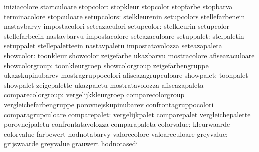                                   iniziacolore                     startculoare
                      stopcolor:  stopkleur                        stopcolor
                                  stopfarbe                        stopbarva
                                  terminacolore                    stopculoare
                    setupcolors:  stelkleurenin                    setupcolors
                                  stellefarbenein                  nastavbarvy
                                  impostacolori                    seteazaculori
                     setupcolor:  stelkleurin                      setupcolor
                                  stellefarbeein                   nastavbarvu
                                  impostacolore                    seteazaculoare
                     setuppalet:  stelpaletin                      setuppalet
                                  stellepaletteein                 nastavpaletu
                                  impostatavolozza                 seteazapaleta
                      showcolor:  toonkleur                        showcolor
                                  zeigefarbe                       ukazbarvu
                                  mostracolore                     afiseazaculoare
                 showcolorgroup:  toonkleurgroep                   showcolorgroup
                                  zeigefarbengruppe                ukazskupinubarev
                                  mostragruppocolori               afiseazagrupculoare
                      showpalet:  toonpalet                        showpalet
                                  zeigepalette                     ukazpaletu
                                  mostratavolozza                  afiseazapaleta
              comparecolorgroup:  vergelijkkleurgroep              comparecolorgroup
                                  vergleichefarbengruppe           porovnejskupinubarev
                                  confrontagruppocolori            comparagrupculoare
                   comparepalet:  vergelijkpalet                   comparepalet
                                  vergleichepalette                porovnejpaletu
                                  confrontatavolozza               comparapaleta
                     colorvalue:  kleurwaarde                      colorvalue
                                  farbewert                        hodnotabarvy
                                  valorecolore                     valoareculoare
                      greyvalue:  grijswaarde                      greyvalue
                                  grauwert                         hodnotasedi
